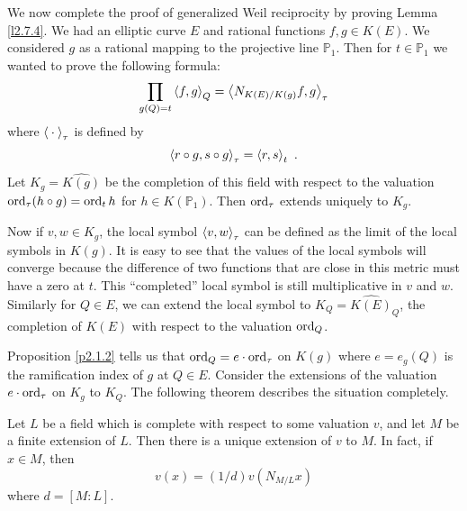 We now complete the proof of generalized Weil reciprocity by proving Lemma \ref{l2.7.4}. We had an elliptic curve $E$ and rational functions $f,g\in K(E)$. We considered $g$ as a rational mapping to the projective line $\mathbb{P}_{1}$. Then for $t \in \mathbb{P}_{1}$ we wanted to prove the following formula:
$$
\prod_{g(Q)=t}\left\langle f,g \right \rangle_{Q} = \left\langle N_{K(E)/K(g)}f, g \right \rangle_{\tau}
$$
where $\left\langle \: \cdot\:  \right \rangle_{\tau}$ is defined by
$$
\left\langle r\circ g, s\circ g \right \rangle_{\tau} = \left\langle r, s \right \rangle_{t}\ .
$$
Let $K_{g}=\widehat{K(g)}$ be the completion of this field with respect to the valuation $\operatorname{ord}_{\tau}(h\circ g)=\operatorname{ord}_{t}h$ for $h\in K(\mathbb{P}_{1})$. Then $\operatorname{ord}_{\tau}$ extends uniquely to $K_{g}$.

Now if $v,w\in K_{g}$, the local symbol $\left\langle v, w \right \rangle_{\tau}$ can be defined as the limit of the local symbols in $K(g)$. It is easy to see that the values of the local symbols will converge because the difference of two functions that are close in this metric must have a zero at $t$. This ``completed'' local symbol is still multiplicative in $v$ and $w$. Similarly for $Q\in E$, we can extend the local symbol to $K_{Q}=\widehat{K(E)}_{Q}$, the completion of $K(E)$ with respect to the valuation $\operatorname{ord}_{Q}$.

Proposition \ref{p2.1.2} tells us that $\operatorname{ord}_{Q}=e\cdot \operatorname{ord}_{\tau}$ on $K(g)$ where $e=e_{g}(Q)$ is the ramification index of $g$ at $Q\in E$. Consider the extensions of the valuation $e\cdot \operatorname{ord}_{\tau}$ on $K_{g}$ to $K_{Q}$. The following theorem describes the situation completely.

\begin{theo}
\label{t2.9.14}
Let $L$ be a field which is complete with respect to some valuation $v$, and let $M$ be a finite extension of $L$. Then there is a unique extension of $v$ to $M$. In fact, if $x\in M$, then
$$
v(x)=(1/d)v(N_{M/L}x)
$$
where $d=[M:L]$.
\end{theo}

